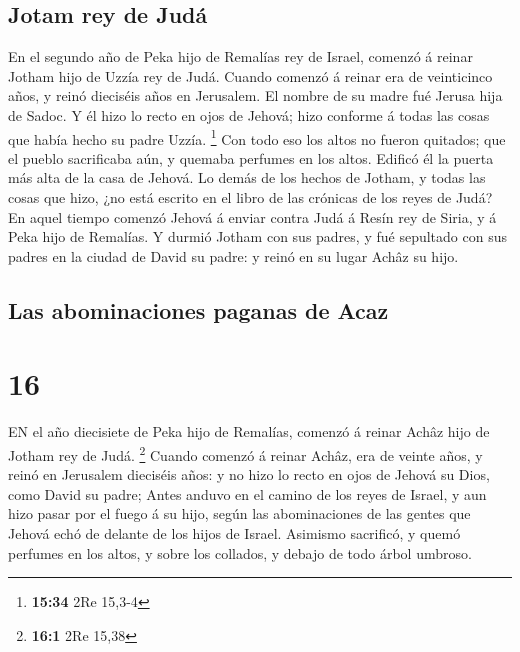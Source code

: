 \hypertarget{jotam-rey-de-juduxe1}{%
\subsection{Jotam rey de Judá}\label{jotam-rey-de-juduxe1}}

 En el segundo año de Peka hijo de Remalías rey de Israel,
comenzó á reinar Jotham hijo de Uzzía rey de Judá.  Cuando
comenzó á reinar era de veinticinco años, y reinó dieciséis años en
Jerusalem. El nombre de su madre fué Jerusa hija de Sadoc. 
Y él hizo lo recto en ojos de Jehová; hizo conforme á todas las cosas
que había hecho su padre Uzzía. \footnote{\textbf{15:34} 2Re 15,3-4}
 Con todo eso los altos no fueron quitados; que el pueblo
sacrificaba aún, y quemaba perfumes en los altos. Edificó él la puerta
más alta de la casa de Jehová.  Lo demás de los hechos de
Jotham, y todas las cosas que hizo, ¿no está escrito en el libro de las
crónicas de los reyes de Judá?  En aquel tiempo comenzó
Jehová á enviar contra Judá á Resín rey de Siria, y á Peka hijo de
Remalías.  Y durmió Jotham con sus padres, y fué sepultado
con sus padres en la ciudad de David su padre: y reinó en su lugar Achâz
su hijo.

\hypertarget{las-abominaciones-paganas-de-acaz}{%
\subsection{Las abominaciones paganas de
Acaz}\label{las-abominaciones-paganas-de-acaz}}

\hypertarget{section-15}{%
\section{16}\label{section-15}}

 EN el año diecisiete de Peka hijo de Remalías, comenzó á
reinar Achâz hijo de Jotham rey de Judá. \footnote{\textbf{16:1} 2Re
  15,38}  Cuando comenzó á reinar Achâz, era de veinte años,
y reinó en Jerusalem dieciséis años: y no hizo lo recto en ojos de
Jehová su Dios, como David su padre;  Antes anduvo en el
camino de los reyes de Israel, y aun hizo pasar por el fuego á su hijo,
según las abominaciones de las gentes que Jehová echó de delante de los
hijos de Israel.  Asimismo sacrificó, y quemó perfumes en
los altos, y sobre los collados, y debajo de todo árbol umbroso.

